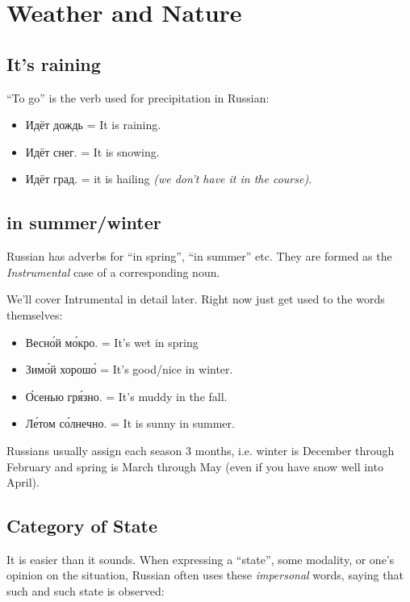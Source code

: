 \chapter{Weather and Nature}\label{weather-and-nature}

\section{It's raining}\label{its-raining}

``To go'' is the verb used for precipitation in Russian:

\begin{itemize}
\tightlist
\item
  Идёт дождь = It is raining.
\item
  Идёт снег. = It is snowing.
\item
  Идёт град. = it is hailing \emph{(we don't have it in the course)}.
\end{itemize}

\section{in summer/winter}\label{in-summerwinter}

Russian has adverbs for ``in spring'', ``in summer'' etc. They are
formed as the \emph{Instrumental} case of a corresponding noun.

We'll cover Intrumental in detail later. Right now just get used to the
words themselves:

\begin{itemize}
\tightlist
\item
  Весн\'{о}й м\'{о}кро. = It's wet in spring
\item
  Зим\'{о}й хорош\'{о} = It's good/nice in winter.
\item
  \'{О}сенью гр\'{я}зно. = It's muddy in the fall.
\item
  Л\'{е}том с\'{о}лнечно. = It is sunny in summer.
\end{itemize}

Russians usually assign each season 3 months, i.e. winter is December
through February and spring is March through May (even if you have snow
well into April).

\section{Category of State}\label{category-of-state}

It is easier than it sounds. When expressing a ``state'', some modality,
or one's opinion on the situation, Russian often uses these
\emph{impersonal} words, saying that such and such state is observed:


